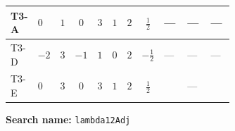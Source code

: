 \documentclass[8pt]{article}
\begin{document}
\begin{landscape}
\begin{longtable}{@{}llcccccc >{\raggedright\arraybackslash}p{0.21\linewidth} >{\raggedright\arraybackslash}p{0.21\linewidth} >{\raggedright\arraybackslash}p{0.21\linewidth}@{}}
\midrule
T3-A & $0$ & $1$ & $0$ & $3$ & $1$ & $2$ & $\frac{1}{2}$ & --- & --- & --- \\
\midrule
T3-D & $-2$ & $3$ & $-1$ & $1$ & $0$ & $2$ & $-\frac{1}{2}$ & --- & --- & --- \\
\midrule
T3-E & $0$ & $3$ & $0$ & $3$ & $1$ & $2$ & $\frac{1}{2}$ & \scriptsize\adjustbox{max width=\linewidth}{$\begin{gathered} -\frac{2}{9} {\lambda_{T3}} \left({\lambda_{T3}}\right)^{*}\end{gathered}$} & --- & \scriptsize\adjustbox{max width=\linewidth}{$\begin{gathered} -24 {g_2}^2 {\lambda_{12}^{\rm Adj}}\end{gathered}$} \\
\midrule
\bottomrule
\end{longtable}
\clearpage
\noindent\textbf{Search name: }\texttt{lambda12Adj}\par\smallskip

\end{landscape}
\end{document}
